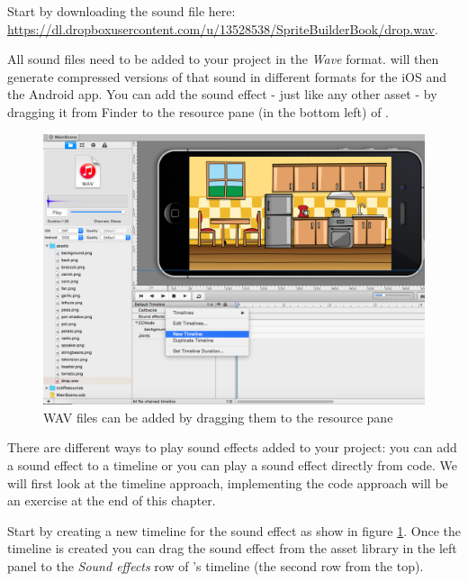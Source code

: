 Start by downloading the sound file here:
\url{https://dl.dropboxusercontent.com/u/13528538/SpriteBuilderBook/drop.wav}.

All sound files need to be added to your \SB{} project in the \textit{Wave}
format. \SB{} will then generate compressed versions of that sound in different
formats for the iOS and the Android app. You can add the sound effect - just
like any other asset - by dragging it from Finder to the resource pane (in the
bottom left) of \SB{}.

\begin{figure}[H]
		\centering
		\includegraphics[width=0.9\linewidth]{images/Chapter2/new_timeline_audio.png}
		\caption{WAV files can be added by dragging them to the resource
		pane}\label{fig:audio_new_timeline}
\end{figure}

There are different ways to play sound effects added to your \SB{} project: you
can add a sound effect to a \SB{} timeline or you can play a sound effect
directly from code. We will first look at the timeline approach, implementing the code
approach will be an exercise at the end of this chapter.

Start by creating a new timeline for the sound effect as show in figure
\ref{fig:audio_new_timeline}. Once the timeline is created you can drag the
sound effect from the asset library in the left panel to the \textit{Sound
effects} row of \SB{}'s timeline (the second row from the top).

